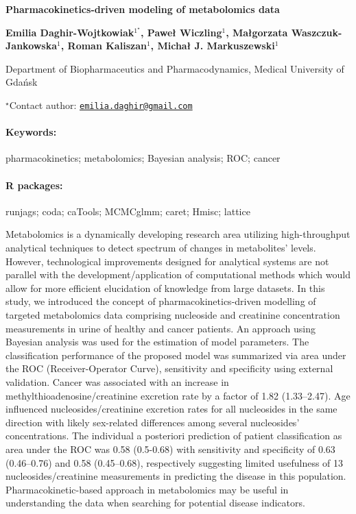 \documentclass[11pt, a4paper]{article}
\renewcommand{\title}[1]{\begin{center}{\bf \LARGE #1}\end{center}}
\newcommand{\keywords}{\paragraph{Keywords:}}
\newcommand{\packages}{\paragraph{R packages:}}
\begin{document}
\pagestyle{empty}

\title{Pharmacokinetics-driven modeling of metabolomics data}

\begin{center}
  {\bf Emilia Daghir-Wojtkowiak$^{1^\star}$, Paweł Wiczling$^{1}$, Małgorzata Waszczuk-Jankowska$^{1}$, Roman Kaliszan$^{1}$, Michał J. Markuszewski$^{1}$}
\end{center}

\vskip 0.3cm

\begin{affiliations}
\begin{enumerate}
\begin{minipage}{0.915\textwidth}
\centering
\item Department of Biopharmaceutics and Pharmacodynamics, Medical University
of Gdańsk \\[-2pt]
\end{minipage}
\end{enumerate}
$^\star$Contact author: \href{mailto:emilia.daghir@gmail.com}{\nolinkurl{emilia.daghir@gmail.com}}\\
\end{affiliations}

\vskip 0.5cm

\begin{minipage}{0.915\textwidth}
\keywords pharmacokinetics; metabolomics; Bayesian analysis; ROC; cancer
\packages runjags; coda; caTools; MCMCglmm; caret; Hmisc; lattice
\end{minipage}

\vskip 0.8cm

Metabolomics is a dynamically developing research area utilizing
high-throughput analytical techniques to detect spectrum of changes in
metabolites' levels. However, technological improvements designed for
analytical systems are not parallel with the development/application of
computational methods which would allow for more efficient elucidation
of knowledge from large datasets. In this study, we introduced the
concept of pharmacokinetics-driven modelling of targeted metabolomics
data comprising nucleoside and creatinine concentration measurements in
urine of healthy and cancer patients. An approach using Bayesian
analysis was used for the estimation of model parameters. The
classification performance of the proposed model was summarized via area
under the ROC (Receiver-Operator Curve), sensitivity and specificity
using external validation. Cancer was associated with an increase in
methylthioadenosine/creatinine excretion rate by a factor of 1.82
(1.33--2.47). Age influenced nucleosides/creatinine excretion rates for
all nucleosides in the same direction with likely sex-related
differences among several nucleosides' concentrations. The individual a
posteriori prediction of patient classification as area under the ROC
was 0.58 (0.5-0.68) with sensitivity and specificity of 0.63
(0.46--0.76) and 0.58 (0.45--0.68), respectively suggesting limited
usefulness of 13 nucleosides/creatinine measurements in predicting the
disease in this population. Pharmacokinetic-based approach in
metabolomics may be useful in understanding the data when searching for
potential disease indicators.
\end{document}
